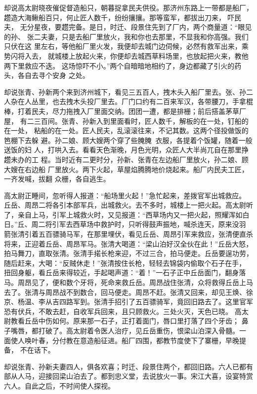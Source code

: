 却说高太尉晓夜催促督造船只，朝暮捉拿民夫供役。那济州东路上一带都是船厂，
趱造大海鳅船百只，何止匠人数千，纷纷攘攘。那等蛮军，都拔出刀来，吓民夫，
无分星夜，要趱完备。是日，时迁、段景住先到了厂内，两个商量道：“眼见的孙、
张二夫妻，只是去船厂里放火，我和你也去那里，不显我和你高强。我们只伏在这
里左右，等他船厂里火发，我便却去城门边伺候，必然有救军出来，乘势闪将入去，
就城楼上放起火来，你便却去城西草料场里，也放起把火来，教他两下里救应不迭。
这场惊吓不小。”两个自暗暗地相约了，身边都藏了引火的药头，各自去寻个安身
之处。

却说张青、孙新两个来到济州城下，看见三五百人，拽木头入船厂里去。张、孙二
人杂在人丛里，也去拽木头投厂里去。厂门口约有二百来军汉，各带腰刀，手拿棍
棒，打着民夫，尽力拖拽入厂里面交纳。团团一遭，都是排栅；前后搭盖茅草厂屋，
有二三百间。张青、孙新入到里面看时，匠人数千，解板的在一处，钉船的在一处，
粘船的在一处。匠人民夫，乱滚滚往来，不记其数。这两个径投做饭的笆棚下去躲
避。孙二娘、顾大嫂两个穿了些腌腌衣服，各提着个饭罐，随着一般送饭的妇
人，打哄入去。看看天色渐晚，月色光明，众匠人大半尚兀自在那里挣趱未办的工
程。当时近有二更时分，孙新、张青在左边船厂里放火，孙二娘、顾大嫂在右边船
厂里放火。两下火起，草屋焰腾腾地价烧起来。船厂内民夫工匠，一齐发喊，拔翻
众栅，各自逃生。

高太尉正睡间，忽听得人报道：“船场里火起！”急忙起来，差拨官军出城救应。
丘岳、周昂二将各引本部军兵，出城救火。去不多时，城楼上一把火起。高太尉听
了，亲自上马，引军上城救火时，又见报道：“西草场内又一把火起，照耀浑如白
日。”丘、周二将引军去西草场中救护时，只听得鼓声振地，喊杀连天，原来没羽
箭张清引着五百骠骑马军，在那里埋伏，看见丘岳、周昂引军来救应，张清便直杀
将来，正迎着丘岳、周昂军马。张清大喝道：“梁山泊好汉全伙在此！”丘岳大怒，
拍马舞刀，直取张清。张清手掿长枪来迎，不过三合，拍马便走。丘岳要逞功劳，
随后赶来，大喝：“反贼休走！”张清按住长枪，轻轻去锦袋内偷取个石子在手，
扭回身躯，看丘岳来得较近，手起喝声道：“着！”一石子正中丘岳面门，翻身落
马。周昂见了，便和数个牙将，死命来救丘岳。周昂战住张清，众将救得丘岳上马
去了。张清与周昂战不到数合，回马便走。周昂不赶。张清又回来，却见王焕、徐
京、杨温、李从吉四路军到。张清手招引了五百骠骑军，竟回旧路去了。这里官军
恐有伏兵，不敢去赶，自收军兵回来，且只顾救火。三处火灭，天色已晓。
高太尉教看丘岳中伤如何。原来那一石子，正打着面门，唇口里打落了四个牙齿；
鼻子嘴唇，都打破了。高太尉着令医人治疗，见丘岳重伤，恨梁山泊深入骨髓。一
面使人唤叶春，分付教在意造船征进。船厂四围，都教节度使下了寨栅，早晚提备，
不在话下。

却说张青、孙新夫妻四人，俱各欢喜；时迁、段景住两个，都回旧路。六人已都有
部从人马，迎接回梁山泊去了。都到忠义堂，去说放火一事。宋江大喜，设宴特赏
六人。自此之后，不时间使人探视。

